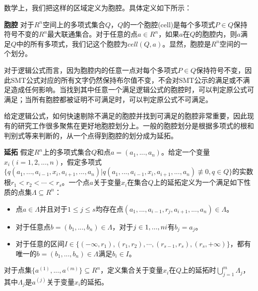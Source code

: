 数学上，我们把这样的区域定义为胞腔。具体定义如下所示：

\begin{definition}{\textbf{胞腔}}
对于$R^n$空间上的多项式集合$Q$，$Q$的一个胞腔(cell)是每个多项式$P \in Q$保持符号不变的$R^n$最大联通集合。对于任意的点$a \in R^n$，如果$a$在$Q$的胞腔内，则$a$满足$Q$中的所有多项式，我们记这个胞腔为$cell(Q, a)$。显然，胞腔是$R^n$空间的一个划分。
\end{definition}

对于逻辑公式而言，因为胞腔内的任意一点对每个多项式$P \in Q$保持符号不变，因此SMT公式对应的所有文字仍然保持布尔值不变，不会对SMT公示的满足或不满足造成任何影响。当找到其中任意一个满足逻辑公式的胞腔时，可以判定原公式可满足；当所有胞腔都被证明不可满足时，可以判定原公式不可满足。

给定逻辑公式，如何快速剔除不满足的胞腔并找到可满足的胞腔非常重要，因此现有的研究工作很多聚焦在更好地胞腔划分上。一般的胞腔划分是根据多项式的根和判别式等来判断的，从一个点得到胞腔的划分成为延拓。

\begin{definition}{\textbf{延拓}}
假定$R^n$上的多项式集合$Q$和点$a = (a_1, ..., a_n)$。给定一个变量$x_i (i = 1, 2,..., n)$，假定多项式$
\{q(a_1, ..., a_{i-1}, x_i, a_{i+1}, ..., a_n) | q(a_1, ..., a_{i-1}, x_i, a_{i+1}, ..., a_n) \nequiv 0, q \in Q\}$的实数根$r_1 < r_2 < \cdots < r_s$。一个点$a$关于变量$x_i$在集合$Q$上的延拓定义为一个满足如下性质的点集$\Lambda \subseteq R^n$：
\begin{itemize}
    \item 点$a \in \Lambda$并且对于$1 \leq j \leq s$均存在点$(a_1, ..., a_{i-1}, r_j, a_{i+1}, ..., a_n) \in \Lambda$。
    \item 对于任意点$b = (b_1, ..., b_n) \in \Lambda$，对于$j \in {1, ..., n} \\ {i}$有$b_j = a_j$。
    \item 对于任意的区间$I \in \{(-\infty, r_1), (r_1, r_2), \cdots, (r_{s-1}, r_s), (r_s, +\infty)\}$，都有唯一的$b = (b_1, ..., b_n) \in \Lambda$满足$b_i \in I$。
\end{itemize}
对于点集$\{a^{(1)}, ..., a^{(m)}\} \subseteq R^n$，定义集合关于变量$x_i$在$Q$上的延拓时$\bigcup_{j=1}^m \Lambda_j$，其中$\Lambda_j$是$a^{(j)}$关于变量$x_i$的延拓。
\end{definition}

